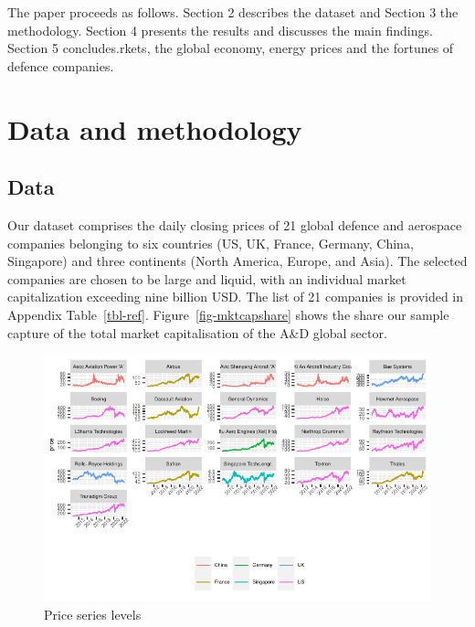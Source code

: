 \documentclass[
  number]{elsarticle}
\begin{document}
The paper proceeds as follows. Section 2 describes the dataset and
Section 3 the methodology. Section 4 presents the results and discusses
the main findings. Section 5 concludes.rkets, the global economy, energy
prices and the fortunes of defence companies.

\hypertarget{data-and-methodology}{%
\section{Data and methodology}\label{data-and-methodology}}

\hypertarget{data}{%
\subsection{Data}\label{data}}

Our dataset comprises the daily closing prices of 21 global defence and
aerospace companies belonging to six countries (US, UK, France, Germany,
China, Singapore) and three continents (North America, Europe, and
Asia). The selected companies are chosen to be large and liquid, with an
individual market capitalization exceeding nine billion USD. The list of
21 companies is provided in Appendix Table~\ref{tbl-ref}.
Figure~\ref{fig-mktcapshare} shows the share our sample capture of the
total market capitalisation of the A\&D global sector.

\begin{figure}[H]

{\centering \includegraphics{defence_files/figure-pdf/fig-prices-1.pdf}

}

\caption{\label{fig-prices}Price series levels}

\end{figure}
\end{document}
